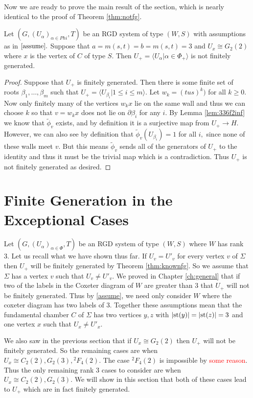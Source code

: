 \documentclass[class=book, crop=false]{standalone}
\begin{document}
Now we are ready to prove the main result of the section, which is nearly identical to the proof of Theorem \ref{thm:notfg}.
\begin{theorem}
	\label{thm:336f2notfg}
	Let $(G,(U_\alpha)_{\alpha\in Phi},T)$ be an RGD system of type $(W,S)$ with assumptions as in $\eqref{assume}.$ Suppose that $a=m(s,t)=b=m(s,t)=3$ and $U_x\cong G_2(2)$ where $x$ is the vertex of $C$ of type $S.$ Then $U_+=\langle U_\alpha|\alpha\in \Phi_+\rangle$ is not finitely generated.
\end{theorem}
\begin{proof}
	Suppose that $U_+$ is finitely generated. Then there is some finite set of roots $\beta_1,\dots,\beta_m$ such that $U_+=\langle U_{\beta_i}|1\le i\le m\rangle.$ Let $w_k=(tus)^k)$ for all $k\ge 0.$ Now only finitely many of the vertices $w_kx$ lie on the same wall and thus we can choose $k$ so that $v=w_kx$ does not lie on $\partial \beta_i$ for any $i.$ By Lemma \ref{lem:336f2inf} we know that $\tilde{\phi}_v$ exists, and by definition it is a surjective map from $U_+\to H.$ However, we can also see by definition that $\tilde{\phi}_v(U_{\beta_i})=1$ for all $i,$ since none of these walls meet $v.$ But this means $\tilde{\phi}_v$ sends all of the generators of $U_+$ to the identity and thus it must be the trivial map which is a contradiction. Thus $U_+$ is not finitely generated as desired.
\end{proof}

\section{Finite Generation in the Exceptional Cases}
Let $(G,(U_\alpha)_{\alpha\in \Phi},T)$ be an RGD system of type $(W,S)$ where $W$ has rank 3. Let us recall what we have shown thus far. If $U_v=U'_v$ for every vertex $v$ of $\Sigma$ then $U_+$ will be finitely generated by Theorem \ref{thm:knownfg}. So we assume that $\Sigma$ has a vertex $v$ such that $U_v\neq U'_v.$ We proved in Chapter \ref{ch:general} that if two of the labels in the Coxeter diagram of $W$ are greater than 3 that $U_+$ will not be finitely generated. Thus by \eqref{assume}, we need only consider $W$ where the coxeter diagram has two labels of 3. Together these assumptions mean that the fundamental chamber $C$ of $\Sigma$ has two vertices $y,z$ with $|\mathrm{st}(y)|=|\mathrm{st}(z)|=3$ and one vertex $x$ such that $U_x\neq U'_x.$

We also saw in the previous section that if $U_x\cong G_2(2)$ then $U_+$ will not be finitely generated. So the remaining cases are when $U_x\cong C_2(2),G_2(3),{}^2F_4(2).$ The case ${}^2F_4(2)$ is impossible by \textcolor{red}{some reason}. Thus the only remaining rank 3 cases to consider are when $U_x\cong C_2(2),G_2(3).$ We will show in this section that both of these cases lead to $U_+$ which are in fact finitely generated.
\end{document}

